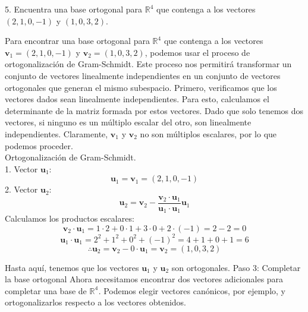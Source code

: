 5. Encuentra una base ortogonal para \( \mathbb{R}^{4} \) que contenga a los vectores \( (2,1,0,-1) \) y \( (1,0,3,2) \). \\

\begin{solution}
Para encontrar una base ortogonal para \( \mathbb{R}^{4} \) que contenga a los vectores \( \mathbf{v}_1 = (2, 1, 0, -1) \) y \( \mathbf{v}_2 = (1, 0, 3, 2) \), podemos usar el proceso de ortogonalización de Gram-Schmidt. Este proceso nos permitirá transformar un conjunto de vectores linealmente independientes en un conjunto de vectores ortogonales que generan el mismo subespacio. Primero, verificamos que los vectores dados sean linealmente independientes. Para esto, calculamos el determinante de la matriz formada por estos vectores. Dado que solo tenemos dos vectores, si ninguno es un múltiplo escalar del otro, son linealmente independientes. Claramente, \( \mathbf{v}_1 \) y \( \mathbf{v}_2 \) no son múltiplos escalares, por lo que podemos proceder. \\
Ortogonalización de Gram-Schmidt. \\
1. Vector \( \mathbf{u}_1 \):
\[
   \mathbf{u}_1 = \mathbf{v}_1 = (2, 1, 0, -1)
   \]
2. Vector \( \mathbf{u}_2 \):
\[
   \mathbf{u}_2 = \mathbf{v}_2 - \frac{\mathbf{v}_2 \cdot \mathbf{u}_1}{\mathbf{u}_1 \cdot \mathbf{u}_1} \mathbf{u}_1
   \]
Calculamos los productos escalares:
\[
   \mathbf{v}_2 \cdot \mathbf{u}_1 = 1 \cdot 2 + 0 \cdot 1 + 3 \cdot 0 + 2 \cdot (-1) = 2 - 2 = 0
   \]
\[
   \mathbf{u}_1 \cdot \mathbf{u}_1 = 2^2 + 1^2 + 0^2 + (-1)^2 = 4 + 1 + 0 + 1 = 6
   \]
\[
   \therefore \mathbf{u}_2 = \mathbf{v}_2 - 0 \cdot \mathbf{u}_1 = \mathbf{v}_2 = (1, 0, 3, 2)
   \]

Hasta aquí, tenemos que los vectores \( \mathbf{u}_1 \) y \( \mathbf{u}_2 \) son ortogonales.
Paso 3: Completar la base ortogonal
Ahora necesitamos encontrar dos vectores adicionales para completar una base de $\mathbb{R^4}$. Podemos elegir vectores canónicos, por ejemplo, y ortogonalizarlos respecto a los vectores obtenidos.



\end{solution}
